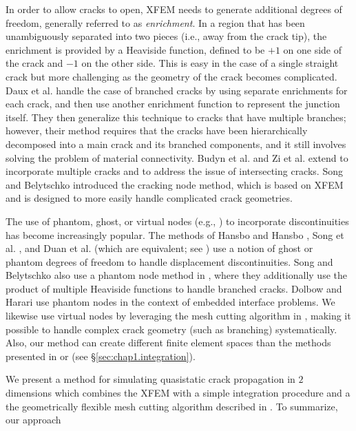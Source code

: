 In order to allow cracks to open, XFEM needs to generate additional degrees of freedom, generally referred to as \emph{enrichment}. In a region that has been unambiguously separated into two pieces (i.e., away from the crack tip), the enrichment is provided by a Heaviside function, defined to be $+1$ on one side of the crack and $-1$ on the other side. This is easy in the case of a single straight crack but more challenging as the geometry of the crack becomes complicated. Daux et al. \cite{Daux00} handle the case of branched cracks by using separate enrichments for each crack, and then use another enrichment function to represent the junction itself. They then generalize this technique to cracks that have multiple branches; however, their method requires that the cracks have been hierarchically decomposed into a main crack and its branched components, and it still involves solving the problem of material connectivity. Budyn et al. \cite{Budyn04} and Zi et al. \cite{Zi.G04} extend \cite{Daux00} to incorporate multiple cracks and to address the issue of intersecting cracks. Song and Belytschko \cite{Song09a} introduced the cracking node method, which is based on XFEM and is designed to more easily handle complicated crack geometries.

The use of phantom, ghost, or virtual nodes (e.g., \cite{Molino05}) to incorporate discontinuities has become increasingly popular. The methods of Hansbo and Hansbo \cite{Hansbo04}, Song et al. \cite{Song06}, and Duan et al. \cite{Duan09} (which are equivalent; see \cite{Areias06}) use a notion of ghost or phantom degrees of freedom to handle displacement discontinuities. Song and Belytschko also use a phantom node method in \cite{Song09b}, where they additionally use the product of multiple Heaviside functions to handle branched cracks. Dolbow and Harari \cite{Dolbow09} use phantom nodes in the context of embedded interface problems. We likewise use virtual nodes by leveraging the mesh cutting algorithm in \cite{Sifakis07}, making it possible to handle complex crack geometry (such as branching) systematically. Also, our method can create different finite element spaces than the methods presented in \cite{Hansbo04} or \cite{Song06} (see \S\ref{sec:chap1.integration}).

We present a method for simulating quasistatic crack propagation in $2$ dimensions which combines the XFEM with a simple integration procedure and a the geometrically flexible mesh cutting algorithm described in \cite{Sifakis07}. To summarize, our approach

